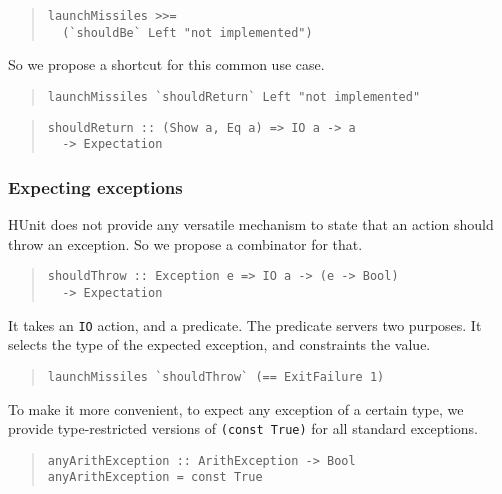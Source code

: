 \documentclass[preprint]{sigplanconf}
\begin{document}
\begin{quote}\small\begin{verbatim}
launchMissiles >>=
  (`shouldBe` Left "not implemented")
\end{verbatim}\end{quote}

\noindent So we propose a shortcut for this common use case.

\begin{quote}\small\begin{verbatim}
launchMissiles `shouldReturn` Left "not implemented"
\end{verbatim}\end{quote}

\begin{quote}\small\begin{verbatim}
shouldReturn :: (Show a, Eq a) => IO a -> a
  -> Expectation
\end{verbatim}\end{quote}


\subsubsection{Expecting exceptions}

HUnit does not provide any versatile mechanism to state that an action
should throw an exception.  So we propose a combinator for that.

\begin{quote}\small\begin{verbatim}
shouldThrow :: Exception e => IO a -> (e -> Bool)
  -> Expectation
\end{verbatim}\end{quote}

\noindent It takes an {\tt IO} action, and a predicate.  The predicate
servers two purposes.  It selects the type of the expected exception,
and constraints the value.

\begin{quote}\small\begin{verbatim}
launchMissiles `shouldThrow` (== ExitFailure 1)
\end{verbatim}\end{quote}

\noindent To make it more convenient, to expect any exception of a
certain type, we provide type-restricted versions of {\tt (const
True)} for all standard exceptions.

\begin{quote}\small\begin{verbatim}
anyArithException :: ArithException -> Bool
anyArithException = const True
\end{verbatim}\end{quote}
\end{document}
